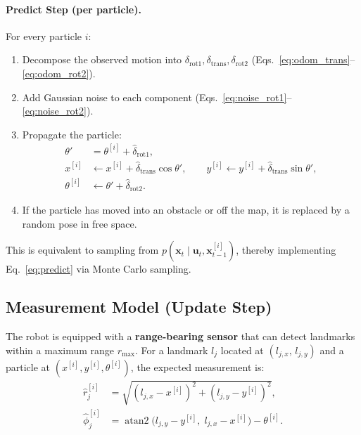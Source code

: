 \documentclass[12pt, a4paper]{article}
\begin{document}
\paragraph{Predict Step (per particle).}
For every particle \(i\):
\begin{enumerate}[nosep]
  \item Decompose the observed motion into \(\delta_{\text{rot1}}, \delta_{\text{trans}}, \delta_{\text{rot2}}\) (Eqs.~\eqref{eq:odom_trans}--\eqref{eq:odom_rot2}).
  \item Add Gaussian noise to each component (Eqs.~\eqref{eq:noise_rot1}--\eqref{eq:noise_rot2}).
  \item Propagate the particle:
  \begin{align}
    \theta' &= \theta^{[i]} + \hat{\delta}_{\text{rot1}}, \label{eq:prop_rot1} \\
    x^{[i]} &\gets x^{[i]} + \hat{\delta}_{\text{trans}} \cos\theta', \qquad
    y^{[i]} \gets y^{[i]} + \hat{\delta}_{\text{trans}} \sin\theta', \label{eq:prop_xy} \\
    \theta^{[i]} &\gets \theta' + \hat{\delta}_{\text{rot2}}. \label{eq:prop_rot2}
  \end{align}
  \item If the particle has moved into an obstacle or off the map, it is replaced by a random pose in free space.
\end{enumerate}
This is equivalent to sampling from \(p(\mathbf{x}_t \mid \mathbf{u}_t, \mathbf{x}_{t-1}^{[i]})\), thereby implementing Eq.~\eqref{eq:predict} via Monte Carlo sampling.

\subsection{Measurement Model (Update Step)}
\label{subsec:measurement}

The robot is equipped with a \textbf{range-bearing sensor} that can detect landmarks within a maximum range \(r_{\max}\).  For a landmark \(l_j\) located at \((l_{j,x},\, l_{j,y})\) and a particle at \((x^{[i]}, y^{[i]}, \theta^{[i]})\), the expected measurement is:
\begin{align}
  \hat{r}_j^{[i]}   &= \sqrt{(l_{j,x} - x^{[i]})^2 + (l_{j,y} - y^{[i]})^2}, \label{eq:exp_range} \\
  \hat{\phi}_j^{[i]} &= \operatorname{atan2}\!\bigl(l_{j,y} - y^{[i]},\; l_{j,x} - x^{[i]}\bigr) - \theta^{[i]}. \label{eq:exp_bearing}
\end{align}
\end{document}
